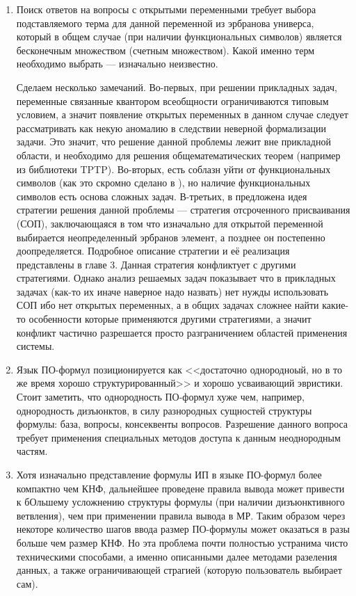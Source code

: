 \begin{enumerate}

\item Поиск ответов на вопросы с открытыми переменными требует выбора подставляемого терма для данной переменной из эрбранова универса, который в общем случае (при наличии функциональных символов) является бесконечным множеством (счетным множеством). Какой именно терм необходимо выбрать --- изначально неизвестно.

Сделаем несколько замечаний. Во-первых, при решении прикладных задач, переменные связанные квантором всеобщности ограничиваются типовым условием, а значит появление открытых переменных в данном случае следует рассматривать как некую аномалию в следствии неверной формализации задачи. Это значит, что решение данной проблемы лежит вне прикладной области, и необходимо для решения общематематических теорем (например из библиотеки TPTP).  Во-вторых, есть соблазн уйти от функциональных символов (как это скромно сделано в \cite{Vas_ICDS}), но наличие функциональных символов есть основа сложных задач. В-третьих, в \cite{Vas_ICDS} предложена идея стратегии решения данной проблемы --- стратегия отсроченного присваивания (СОП), заключающаяся в том что изначально для открытой переменной выбирается неопределенный эрбранов элемент, а позднее он постепенно доопределяется. Подробное описание стратегии и её реализация представлены в главе 3. Данная стратегия конфликтует с другими стратегиями. Однако анализ решаемых задач показывает что в прикладных задачах (как-то их иначе наверное надо назвать) нет нужды использовать СОП ибо нет открытых переменных, а в общих задачах сложнее найти какие-то особенности которые применяются другими стратегиями, а значит конфликт частично разрешается просто разграничением областей применения системы.

\item Язык ПО-формул позиционируется как <<достаточно однородноый, но в то же время хорошо структурированный>> и хорошо усваивающий эвристики. Стоит заметить, что однородность ПО-формул хуже чем, например, однородность дизъюнктов, в силу разнородных сущностей структуры формулы: база, вопросы, консеквенты вопросов. Разрешение данного вопроса требует применения специальных методов доступа к данным неоднородным частям.

\item Хотя изначально представление формулы ИП в языке ПО-формул более компактно чем КНФ, дальнейшее проведене правила вывода может привести к бОльшему усложнению структуры формулы (при наличии дизъюнктивного ветвления), чем при применении правила вывода в МР. Таким образом через некоторе количество шагов ввода размер ПО-формулы может оказаться в разы больше чем размер КНФ. Но эта проблема почти полностью устранима чисто техническими способами, а именно описанными далее методами разеления данных, а также ограничивающей страгией (которую пользователь выбирает сам).

\end{enumerate}


